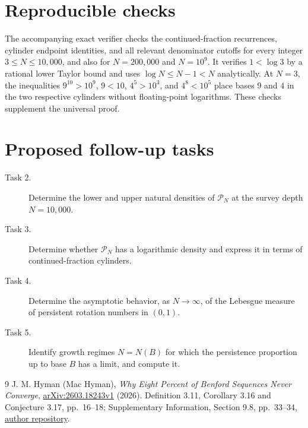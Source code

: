 \documentclass[11pt]{article}
\newcommand{\PN}{\mathcal P_N}
\begin{document}
\section*{Reproducible checks}
The accompanying exact verifier checks the continued-fraction
recurrences, cylinder endpoint identities, and all relevant
denominator cutoffs for every integer $3\le N\le10{,}000$, and
also for $N=200{,}000$ and $N=10^9$. It verifies
$1<\log3$ by a rational lower Taylor bound and uses
$\log N\le N-1<N$ analytically. At $N=3$, the inequalities
$9^{10}>10^9$, $9<10$, $4^5>10^3$, and $4^8<10^5$
place bases $9$ and $4$ in the two respective cylinders without
floating-point logarithms. These checks supplement the universal proof.

\section*{Proposed follow-up tasks}
\begin{description}
\item[Task 2.] Determine the lower and upper natural densities of
$\PN$ at the survey depth $N=10{,}000$.
\item[Task 3.] Determine whether $\PN$ has a logarithmic density and
express it in terms of continued-fraction cylinders.
\item[Task 4.] Determine the asymptotic behavior, as $N\to\infty$,
of the Lebesgue measure of persistent rotation numbers in $(0,1)$.
\item[Task 5.] Identify growth regimes $N=N(B)$ for which the
persistence proportion up to base $B$ has a limit, and compute it.
\end{description}

\begin{thebibliography}{9}
 J. M. Hyman (Mac Hyman),
\emph{Why Eight Percent of Benford Sequences Never Converge},
\href{https://arxiv.org/abs/2603.18243}{arXiv:2603.18243v1} (2026).
Definition 3.11, Corollary 3.16 and Conjecture 3.17, pp.~16--18;
Supplementary Information, Section 9.8, pp.~33--34,
\href{https://github.com/machyman/hyman2026eight/tree/0ffdd7cf0e6f660c789b5fe95bdcef61fa1d48ca/paper}{author repository}.
\end{thebibliography}
\end{document}
